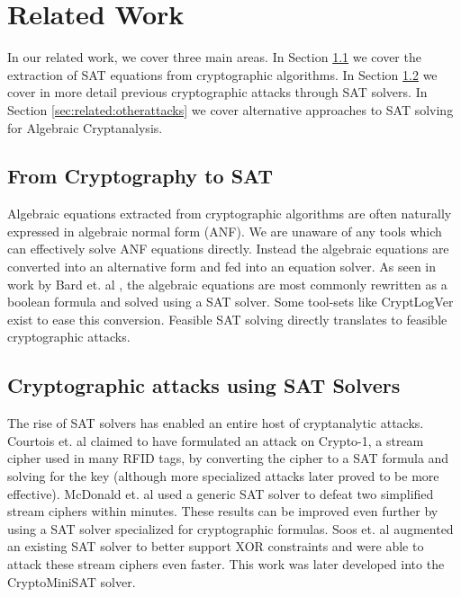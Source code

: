 
\section{Related Work}

In our related work, we cover three main areas. In Section \ref{sec:related:extraction} we cover the extraction of SAT equations from cryptographic algorithms. In Section \ref{sec:related:satattacks} we cover in more detail previous cryptographic attacks through SAT solvers. In Section \ref{sec:related:otherattacks} we cover alternative approaches to SAT solving for Algebraic Cryptanalysis.

\subsection{From Cryptography to SAT}
\label{sec:related:extraction}
Algebraic equations extracted from cryptographic algorithms are often naturally expressed in algebraic normal form (ANF). We are unaware of any tools which can effectively solve ANF equations directly. Instead the algebraic equations are converted into an alternative form and fed into an equation solver. As seen in work by Bard et. al \cite{BCJ07}, the algebraic equations are most commonly rewritten as a boolean formula and solved using a SAT solver. Some tool-sets like CryptLogVer \cite{MS13} exist to ease this conversion. Feasible SAT solving directly translates to feasible cryptographic attacks.

\subsection{Cryptographic attacks using SAT Solvers}
\label{sec:related:satattacks}
The rise of SAT solvers has enabled an entire host of cryptanalytic attacks. Courtois et. al \cite{CNO08} claimed to have formulated an attack on Crypto-1, a stream cipher used in many RFID tags, by converting the cipher to a SAT formula and solving for the key (although more specialized attacks \cite{GGMRVSJ08} later proved to be more effective). McDonald et. al \cite{MCP07} used a generic SAT solver to defeat two simplified stream ciphers within minutes. These results can be improved even further by using a SAT solver specialized for cryptographic formulas. Soos et. al \cite{SNC09} augmented an existing SAT solver to better support XOR constraints and were able to attack these stream ciphers even faster. This work was later developed into the {CryptoMiniSAT} solver.

